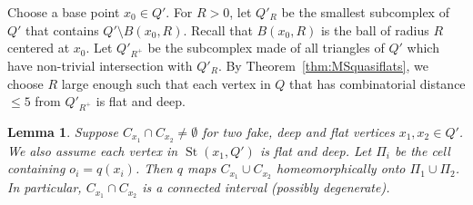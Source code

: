 \documentclass[11pt]{amsart}
\newcommand{\St}{\operatorname{St}}
\newtheorem{lemma}[theorem]{Lemma}
\theoremstyle{definition}
\begin{document}
Choose a base point $x_0\in Q'$. For $R>0$, let $Q'_R$ be the smallest subcomplex of $Q'$ that contains $Q'\setminus B(x_0,R)$. Recall that $B(x_0,R)$ is the ball of radius $R$ centered at $x_0$. Let $Q'_{R^+}$ be the subcomplex made of all triangles of $Q'$ which have non-trivial intersection with $Q'_R$. By Theorem~\ref{thm:MSquasiflats}, we choose $R$ large enough such that each vertex in $Q$ that has combinatorial distance $\le 5$ from $Q'_{R^+}$ is flat and deep.

\begin{lemma}
	\label{lem:intersection of cells}
	Suppose $C_{x_1}\cap C_{x_2}\neq\emptyset$ for two fake, deep and flat vertices $x_1,x_2\in Q'$. We also assume each vertex in $\St(x_1,Q')$ is flat and deep. Let $\Pi_i$ be the cell containing $o_i=q(x_i)$. Then $q$ maps $C_{x_1}\cup C_{x_2}$ homeomorphically onto $\Pi_1\cup\Pi_2$. In particular, $C_{x_1}\cap C_{x_2}$ is a connected interval (possibly degenerate).
\end{lemma}
\end{document}
